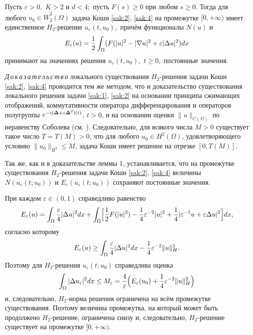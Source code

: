 \smallskip

\begin{theorem}[4]Пусть $\varepsilon >0,$ $K> 2$ и $d<4;$ пусть $F(s)\geq 0$ при любом $s\geq 0.$ Тогда для
любого $u_{0}\in \dot{W}_{2}^{2}(\Omega )$ задача Коши \eqref{sak:2}{\rm ,} \eqref{sak:4} на промежутке \mbox{$[0,+\infty )$} имеет
единственное $H_{2}$-решение $u_{\varepsilon }(t,u_{0}),$
причём функционалы $N(u)$ и $$E_{\varepsilon }(u)={1\over 2}\int_{\Omega }(F(|u|^2-|\nabla u|^2+\varepsilon|\Delta u|^2)dx$$ принимают на значениях
решения $u_{\varepsilon}(t,u_{0}),$ $t\geq 0,$ постоянные значения{\rm .}
\end{theorem}

\smallskip

{\it Д\,о\,к\,а\,з\,а\,т\,е\,л\,ь\,с\,т\,в\,о}\/ локального существования $H_{2}$-решения задачи
Коши \eqref{sak:2}, \eqref{sak:4}
проводится тем же методом, что и доказательство существования
локального решения задачи \eqref{sak:1}, \eqref{sak:2} на основании принципа сжимающих
отображений, коммутативности оператора дифференцирования и
операторов полугруппы $e^{-i({\bf \Delta }+\varepsilon {\bf \Delta } ^{2})(t)}$, $t>0$,
и на основании оценки $\|u\|_{C(\Omega )}$ по неравенству
Соболева (см. \cite{Zhidkov}). 
Следовательно,  для всякого числа $M>0$ существует такое число $T=T(M)>0$,
что для любого $u_{0}\in H^{2}(\Omega )$, удовлетворяющего условию $\|u _0\|_{H^2}\leq M$, задача Коши имеет решение на отрезке $[0,T(M)]$.

Так же, как и в доказательстве леммы 1,  устанавливается, что на промежутке существования $H_{2}$-решения задачи Коши \eqref{sak:2}, \eqref{sak:4} 
величины $N(u_{\varepsilon }(t;u_{0}))$ и $E_{\varepsilon}(u_{\varepsilon }(t;u_{0}))$
сохраняют постоянные значения.

При каждом $\varepsilon\in (0,1)$ справедливо равенство $$E_{\varepsilon
}(u)=\int_{\Omega } {{\varepsilon}\over 4}|\Delta u|^2dx+\int_{\Omega }\Bigl[{1\over 2}F(|u|^2)
-{1\over 4 }\varepsilon
^{-2 }|u|^{2}+{1\over 4}|\varepsilon ^{-1}u+\varepsilon\Delta u|^{2}\Bigr]dx,$$ согласно 
которому $$E_{\varepsilon}(u)\geq \int_{\Omega } {{\varepsilon}\over 4}|\Delta u|^2dx -{1\over 4}\varepsilon ^{-2}\|u\|_{H}^{2}.$$
Поэтому для $H_{2}$-решения $u_{\varepsilon}(t;u_{0})$ справедлива оценка
$$\int_{\Omega } |\Delta u_{\varepsilon}|^{2}dx \leq M_{\varepsilon}={4\over
{\varepsilon}}\Bigl(E_{\varepsilon}(u_{0})+{1\over 4}\varepsilon^{-2}\|u\|_{H}^{2}\Bigr)$$ и, следовательно,
$H_{2}$-норма решения ограничена на всём промежутке
существования. Поэтому величина промежутка, на который
может быть продолжено $H_{2}$-решение, ограничена снизу и,
следовательно, $H_{2}$-решение существует на промежутке
$[0,+\infty )$.

